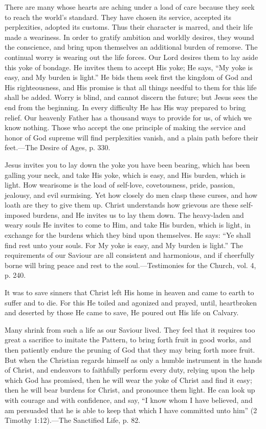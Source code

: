 \documentclass[a4paper, 10pt, twoside, headings=small]{scrartcl}
\begin{document}
\begin{multicols}{2}
There are many whose hearts are aching under a load of care because they seek to reach the world’s standard. They have chosen its service, accepted its perplexities, adopted its customs. Thus their character is marred, and their life made a weariness. In order to gratify ambition and worldly desires, they wound the conscience, and bring upon themselves an additional burden of remorse. The continual worry is wearing out the life forces. Our Lord desires them to lay aside this yoke of bondage. He invites them to accept His yoke; He says, “My yoke is easy, and My burden is light.” He bids them seek first the kingdom of God and His righteousness, and His promise is that all things needful to them for this life shall be added. Worry is blind, and cannot discern the future; but Jesus sees the end from the beginning. In every difficulty He has His way prepared to bring relief. Our heavenly Father has a thousand ways to provide for us, of which we know nothing. Those who accept the one principle of making the service and honor of God supreme will find perplexities vanish, and a plain path before their feet.—The Desire of Ages, p. 330.

Jesus invites you to lay down the yoke you have been bearing, which has been galling your neck, and take His yoke, which is easy, and His burden, which is light. How wearisome is the load of self-love, covetousness, pride, passion, jealousy, and evil surmising. Yet how closely do men clasp these curses, and how loath are they to give them up. Christ understands how grievous are these self-imposed burdens, and He invites us to lay them down. The heavy-laden and weary souls He invites to come to Him, and take His burden, which is light, in exchange for the burdens which they bind upon themselves. He says: “Ye shall find rest unto your souls. For My yoke is easy, and My burden is light.” The requirements of our Saviour are all consistent and harmonious, and if cheerfully borne will bring peace and rest to the soul.—Testimonies for the Church, vol. 4, p. 240.

It was to save sinners that Christ left His home in heaven and came to earth to suffer and to die. For this He toiled and agonized and prayed, until, heartbroken and deserted by those He came to save, He poured out His life on Calvary.

Many shrink from such a life as our Saviour lived. They feel that it requires too great a sacrifice to imitate the Pattern, to bring forth fruit in good works, and then patiently endure the pruning of God that they may bring forth more fruit. But when the Christian regards himself as only a humble instrument in the hands of Christ, and endeavors to faithfully perform every duty, relying upon the help which God has promised, then he will wear the yoke of Christ and find it easy; then he will bear burdens for Christ, and pronounce them light. He can look up with courage and with confidence, and say, “I know whom I have believed, and am persuaded that he is able to keep that which I have committed unto him” (2 Timothy 1:12).—The Sanctified Life, p. 82.


\end{multicols}
\end{document}
